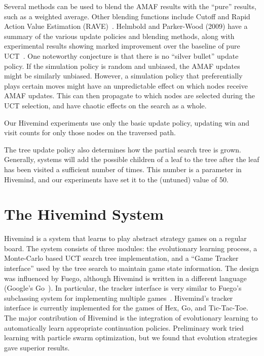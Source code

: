 \documentclass{acm_proc_article-sp}
\begin{document}
Several methods can be used to blend the AMAF results with the ``pure'' results, such as a weighted average.
Other blending functions include Cutoff and Rapid Action Value Estimation (RAVE)~\cite{chaslot2008progressive}. 
Helmbold and Parker-Wood (2009) have a summary of the various update policies and blending methods, along with experimental results showing marked improvement over the baseline of pure UCT~\cite{helmbold2009all}. 
One noteworthy conjecture is that there is no ``silver bullet'' update policy. If the simulation policy is random and unbiased, the AMAF updates might be similarly unbiased. However, a simulation policy that preferentially plays certain moves might have an unpredictable effect on which nodes receive AMAF updates. This can then propagate to which nodes are selected during the UCT selection, and have chaotic effects on the search as a whole. 

Our Hivemind experiments use only the basic update policy, updating win and visit counts for only those nodes on the traversed path.

The tree update policy also determines how the partial search tree is grown.
Generally, systems will add the possible children of a leaf to the tree after the leaf has been visited a sufficient number of times.
This number is a parameter in Hivemind, and our experiments have set it to the (untuned) value of 50.

\section{The Hivemind System}\label{hivemind}

Hivemind is a system that learns to play abstract strategy games on a regular board. 
The system consists of three modules: the evolutionary learning process, a Monte-Carlo based UCT search tree implementation, and a ``Game Tracker interface'' used by the tree search to maintain game state information. 
The design was influenced by Fuego, although Hivemind is written in a different language (Google's Go~\cite{golang}). 
In particular, the tracker interface is very similar to Fuego's subclassing system for implementing multiple games~\cite{Fuego}. 
Hivemind's tracker interface is currently implemented for the games of Hex, Go, and Tic-Tac-Toe. 
The major contribution of Hivemind is the integration of evolutionary learning to automatically learn appropriate continuation policies.
Preliminary work tried learning with particle swarm optimization, but we found that evolution strategies gave
superior results.
\end{document}
